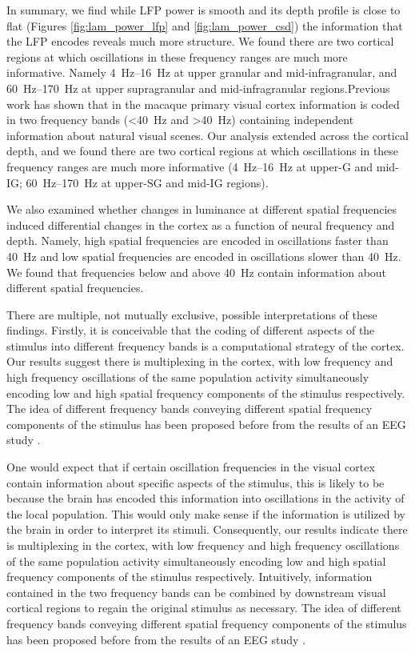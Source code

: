 In summary, we find while \ac{LFP} power is smooth and its depth profile is close to flat (Figures \ref{fig:lam_power_lfp} and \ref{fig:lam_power_csd}) the information that the \ac{LFP} encodes reveals much more structure.
We found there are two cortical regions at which oscillations in these frequency ranges are much more informative.
Namely \SIrange{4}{16}{Hz} at upper granular and mid-infragranular, and \SIrange{60}{170}{Hz} at upper supragranular and mid{}-infragranular regions.Previous work \citep{Belitski2008} has shown that in the macaque primary visual cortex information is coded in two frequency bands (\SI{<40}{Hz} and \SI{>40}{Hz}) containing independent information about natural visual scenes.
Our analysis extended across the cortical depth, and we found there are two cortical regions at which oscillations in these frequency ranges are much more informative (\SIrange{4}{16}{Hz} at upper-\ac{G} and mid-\ac{IG}; \SIrange{60}{170}{Hz} at upper-\ac{SG} and mid-\ac{IG} regions).

We also examined whether changes in luminance at different spatial frequencies induced differential changes in the cortex as a function of neural frequency and depth.
Namely, high spatial frequencies are encoded in oscillations faster than \SI{40}{Hz} and low spatial frequencies are encoded in oscillations slower than \SI{40}{Hz}.
We found that frequencies below and above \SI{40}{Hz} contain information about different spatial frequencies.

There are multiple, not mutually exclusive, possible interpretations of these findings.
Firstly, it is conceivable that the coding of different aspects of the stimulus into different frequency bands is a computational strategy of the cortex.
Our results suggest there is multiplexing in the cortex, with low frequency and high frequency oscillations of the same population activity simultaneously encoding low and high spatial frequency components of the stimulus respectively.
The idea of different frequency bands conveying different spatial frequency components of the stimulus has been proposed before from the results of an \ac{EEG} study \citep{Smith2006}.

One would expect that if certain oscillation frequencies in the visual cortex contain information about specific aspects of the stimulus, this is likely to be because the brain has encoded this information into oscillations in the activity of the local population.
This would only make sense if the information is utilized by the brain in order to interpret its stimuli.
Consequently, our results indicate there is multiplexing in the cortex, with low frequency and high frequency oscillations of the same population activity simultaneously encoding low and high spatial frequency components of the stimulus respectively.
Intuitively, information contained in the two frequency bands can be combined by downstream visual cortical regions to regain the original stimulus as necessary.
The idea of different frequency bands conveying different spatial frequency components of the stimulus has been proposed before from the results of an \ac{EEG} study \citep{Smith2006}.


